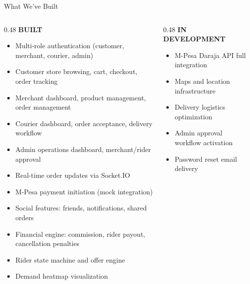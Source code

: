 \documentclass[aspectratio=169]{beamer}
\newcommand{\sectiontitle}[1]{\textbf{\large #1}}
\begin{document}
\begin{frame}{What We've Built}
  \begin{columns}[T]
    \begin{column}{0.48\textwidth}
      \sectiontitle{BUILT}
      \vspace{3mm}
      \begin{itemize}
        \item Multi-role authentication (customer, merchant, courier, admin)
        \item Customer store browsing, cart, checkout, order tracking
        \item Merchant dashboard, product management, order management
        \item Courier dashboard, order acceptance, delivery workflow
        \item Admin operations dashboard, merchant/rider approval
        \item Real-time order updates via Socket.IO
        \item M-Pesa payment initiation (mock integration)
        \item Social features: friends, notifications, shared orders
        \item Financial engine: commission, rider payout, cancellation penalties
        \item Rider state machine and offer engine
        \item Demand heatmap visualization
      \end{itemize}
    \end{column}
    \begin{column}{0.48\textwidth}
      \sectiontitle{IN DEVELOPMENT}
      \vspace{3mm}
      \begin{itemize}
        \item M-Pesa Daraja API full integration
        \item Maps and location infrastructure
        \item Delivery logistics optimization
        \item Admin approval workflow activation
        \item Password reset email delivery
      \end{itemize}
      

\end{column}
\end{columns}
\end{frame}
\end{document}
